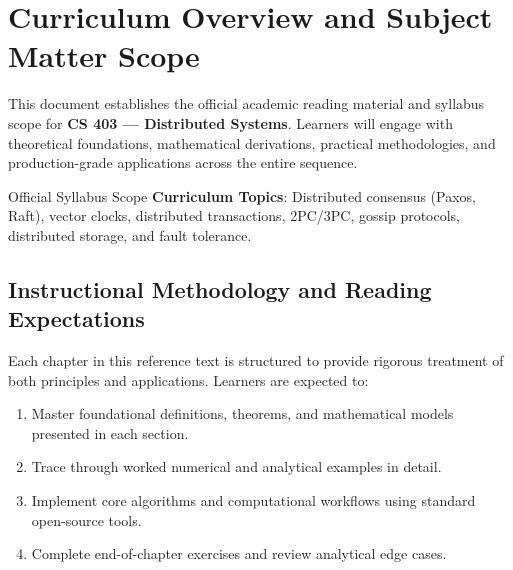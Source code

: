\section{Curriculum Overview and Subject Matter Scope}

This document establishes the official academic reading material and syllabus scope for \textbf{CS 403 --- Distributed Systems}. Learners will engage with theoretical foundations, mathematical derivations, practical methodologies, and production-grade applications across the entire sequence.

\begin{InsightBox}{Official Syllabus Scope}
  \textbf{Curriculum Topics}: Distributed consensus (Paxos, Raft), vector clocks, distributed transactions, 2PC/3PC, gossip protocols, distributed storage, and fault tolerance.
\end{InsightBox}

\subsection{Instructional Methodology and Reading Expectations}

Each chapter in this reference text is structured to provide rigorous treatment of both principles and applications. Learners are expected to:
\begin{enumerate}
  \item Master foundational definitions, theorems, and mathematical models presented in each section.
  \item Trace through worked numerical and analytical examples in detail.
  \item Implement core algorithms and computational workflows using standard open-source tools.
  \item Complete end-of-chapter exercises and review analytical edge cases.
\end{enumerate}

